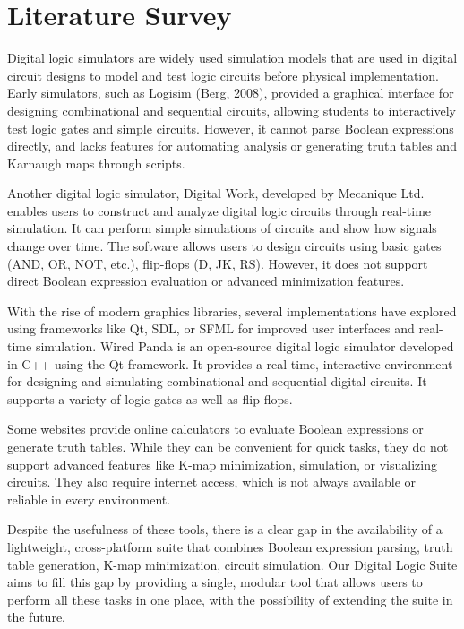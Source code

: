 \section{Literature Survey}
Digital logic simulators are widely used simulation models that are used in digital circuit designs to model and test logic circuits before physical implementation. Early simulators, such as Logisim (Berg, 2008), provided a graphical interface for designing combinational and sequential circuits, allowing students to interactively test logic gates and simple circuits. However, it cannot parse Boolean expressions directly, and lacks features for automating analysis or generating truth tables and Karnaugh maps through scripts.

Another digital logic simulator, Digital Work, developed by Mecanique Ltd. enables users to construct and analyze digital logic circuits through real-time simulation. It can perform simple simulations of circuits and show how signals change over time. The software allows users to design circuits using basic gates (AND, OR, NOT, etc.), flip-flops (D, JK, RS). However, it does not support direct Boolean expression evaluation or advanced minimization features.

With the rise of modern graphics libraries, several implementations have explored using frameworks like Qt, SDL, or SFML for improved user interfaces and real-time simulation. Wired Panda is an open-source digital logic simulator developed in C++ using the Qt framework. It provides a real-time, interactive environment for designing and simulating combinational and sequential digital circuits. It supports a variety of logic gates as well as flip flops.

Some websites provide online calculators to evaluate Boolean expressions or generate truth tables. While they can be convenient for quick tasks, they do not support advanced features like K-map minimization, simulation, or visualizing circuits. They also require internet access, which is not always available or reliable in every environment.

Despite the usefulness of these tools, there is a clear gap in the availability of a lightweight, cross-platform suite that combines Boolean expression parsing, truth table generation, K-map minimization, circuit simulation. Our Digital Logic Suite aims to fill this gap by providing a single, modular tool that allows users to perform all these tasks in one place, with the possibility of extending the suite in the future.
\clearpage